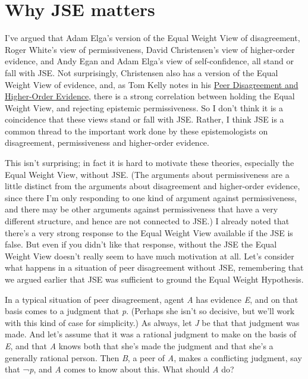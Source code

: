 \documentclass[
  10pt,
  letterpaper,
  DIV=11,
  numbers=noendperiod,
  twoside]{scrartcl}
\begin{document}
\section{Why JSE matters}\label{why-jse-matters}

I've argued that Adam Elga's version of the Equal Weight View of
disagreement, Roger White's view of permissiveness, David Christensen's
view of higher-order evidence, and Andy Egan and Adam Elga's view of
self-confidence, all stand or fall with JSE. Not surprisingly,
Christensen also has a version of the Equal Weight View of evidence,
and, as Tom Kelly notes in his
\href{http://www.princeton.edu/~tkelly/papers/KellyPeerDis-1.doc}{Peer
Disagreement and Higher-Order Evidence}, there is a strong correlation
between holding the Equal Weight View, and rejecting epistemic
permissiveness. So I don't think it is a coincidence that these views
stand or fall with JSE. Rather, I think JSE is a common thread to the
important work done by these epistemologists on disagreement,
permissiveness and higher-order evidence.

This isn't surprising; in fact it is hard to motivate these theories,
especially the Equal Weight View, without JSE. (The arguments about
permissiveness are a little distinct from the arguments about
disagreement and higher-order evidence, since there I'm only responding
to one kind of argument against permissiveness, and there may be other
arguments against permissiveness that have a very different structure,
and hence are not connected to JSE.) I already noted that there's a very
strong response to the Equal Weight View available if the JSE is false.
But even if you didn't like that response, without the JSE the Equal
Weight View doesn't really seem to have much motivation at all. Let's
consider what happens in a situation of peer disagreement without JSE,
remembering that we argued earlier that JSE was sufficient to ground the
Equal Weight Hypothesis.

In a typical situation of peer disagreement, agent \emph{A} has evidence
\emph{E}, and on that basis comes to a judgment that \emph{p}. (Perhaps
she isn't so decisive, but we'll work with this kind of case for
simplicity.) As always, let \emph{J} be that that judgment was made. And
let's assume that it was a rational judgment to make on the basis of
\emph{E}, and that \emph{A} knows both that she's made the judgment and
that she's a generally rational person. Then \emph{B}, a peer of
\emph{A}, makes a conflicting judgment, say that ¬\emph{p}, and \emph{A}
comes to know about this. What should \emph{A} do?
\end{document}

